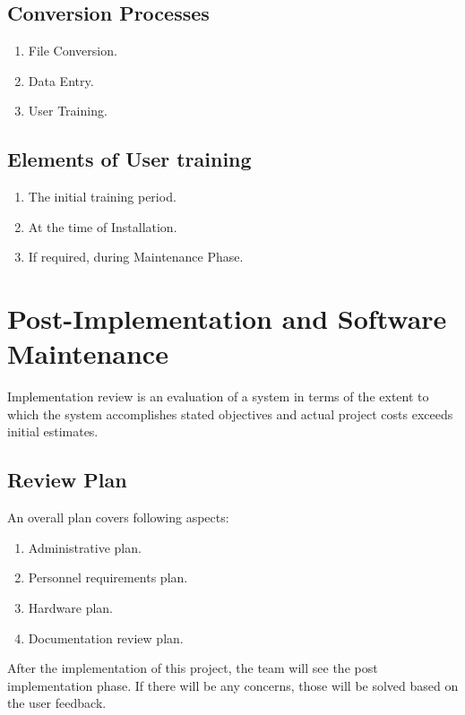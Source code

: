 \subsection{Conversion Processes}
\begin{enumerate}
\item File Conversion.
\item  Data Entry.
\item User Training.
\end{enumerate}
\vskip 0.5cm
\subsection{Elements of User training}
\begin{enumerate}
\item The initial training period.
\item At the time of Installation.
\item If required, during Maintenance Phase.
\end{enumerate}

\section{Post-Implementation and Software Maintenance}
Implementation review is an evaluation of a system in terms of the 
extent to which the system accomplishes stated objectives and actual 
project costs exceeds initial estimates.
\subsection{Review Plan}
An overall plan covers following aspects:
\begin{enumerate}
\item Administrative plan.
\item Personnel requirements plan.
\item Hardware plan.
\item Documentation review plan.
\end{enumerate}
\vskip 0.5cm
After the implementation of this project, the team will see the post 
implementation phase. If there will be any concerns, those will be 
solved based on the user feedback.
